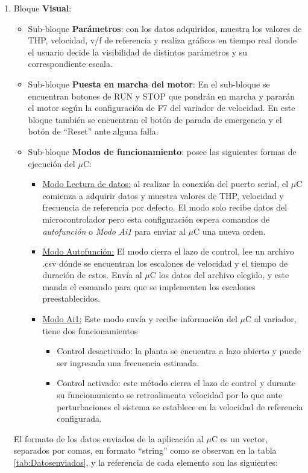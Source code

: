 \begin{enumerate}
\item Bloque \textbf{Visual}: 
\begin{itemize}
\item Sub-bloque \textbf{Parámetros}: con los datos adquiridos, muestra los valores de THP, velocidad, v/f de referencia y realiza gráficos en tiempo real donde el usuario decide la visibilidad de distintos parámetros y su correspondiente escala. 
\item Sub-bloque \textbf{Puesta en marcha del motor}: En el sub-bloque se encuentran botones de RUN y STOP que pondrán en marcha y pararán el motor según la configuración de F7 del variador de velocidad. En este bloque también se encuentran el botón de parada de emergencia y el botón de “Reset” ante alguna falla. 
\item Sub-bloque \textbf{Modos de funcionamiento}: posee las siguientes formas de ejecución del $\mu$C:
\begin{itemize}
\item \underline{Modo Lectura de datos:} al realizar la conexión del puerto serial, el $\mu$C comienza a adquirir datos y muestra valores de THP, velocidad y frecuencia de referencia por defecto. El modo solo recibe datos del microcontrolador pero esta configuración espera comandos de \textit{autofunción} o \textit{Modo Ai1} para enviar al $\mu$C una nueva orden.
\item \underline{Modo Autofunción:} El modo cierra el lazo de control, lee un archivo .csv dónde se encuentran los escalones de velocidad y el tiempo de duración de estos. Envía al $\mu$C los datos del archivo elegido, y este manda el
comando para que se implementen los escalones preestablecidos.

\item \underline{Modo Ai1:} Este modo envía y recibe información del $\mu$C al variador, tiene dos funcionamientos
\begin{itemize}
\item Control desactivado: la planta se encuentra a lazo abierto y puede ser ingresada una frecuencia estimada.
\item Control activado: este método cierra el lazo de control y durante su funcionamiento se retroalimenta velocidad por lo que ante perturbaciones el sistema se establece en la velocidad de referencia configurada.
\end{itemize}
\end{itemize}
\end{itemize}


El formato de los datos enviados de la aplicación al $\mu$C es un vector, separados por comas, en formato “string” como se observan en la tabla \ref{tab:Datosenviados}, y la referencia de cada elemento son las siguientes:


\end{enumerate}
